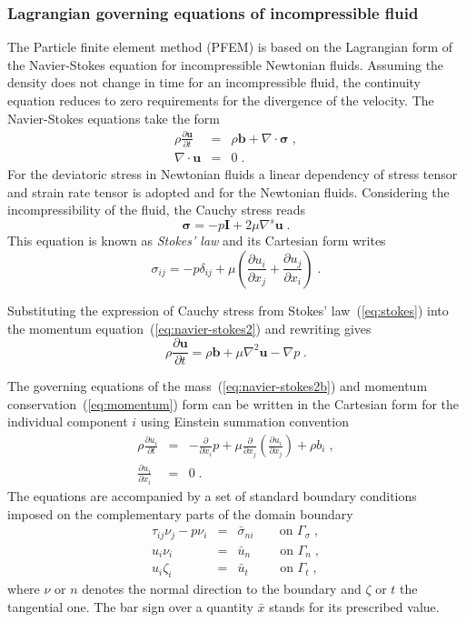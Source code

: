 \documentclass[a4paper]{article}
\newcommand{\mbf}[1]{\boldsymbol{#1}}
\newcommand{\pard}[2]{\frac{\partial{#1}}{\partial{#2}}}
\begin{document}
\subsubsection{Lagrangian governing equations of incompressible fluid}
The Particle finite element method (PFEM) is based on the Lagrangian form of the Navier-Stokes equation for incompressible Newtonian fluids. Assuming the density does not change in time for an incompressible fluid, the continuity equation reduces to zero requirements for the divergence of the velocity. The Navier-Stokes equations take the form
\begin{eqnarray}
\rho\pard{\mbf{u}}{t} &=& \rho\mbf{b} + \nabla\cdot\mbf{\sigma} \label{eq:navier-stokes2}\;,\\
\nabla\cdot\mbf{u} &=& 0\;. \label{eq:navier-stokes2b}
\end{eqnarray}
For the deviatoric stress in Newtonian fluids a linear dependency of stress tensor and strain rate tensor is adopted and for the Newtonian fluids. Considering the incompressibility of the fluid, the Cauchy stress reads
\begin{equation}\label{eq:stokes}
\mbf{\sigma}=-p\mbf{I} + 2\mu \nabla^s\mbf{u}\;.
\end{equation}
This equation is known as \emph{Stokes' law} and its Cartesian form writes
\begin{equation}
\sigma_{ij}=-p\delta_{ij}+\mu\left(\pard{u_i}{x_j}+\pard{u_j}{x_i}\right)\;.
\end{equation}
\par
Substituting the expression of Cauchy stress from Stokes' law~(\ref{eq:stokes}) into the momentum equation~(\ref{eq:navier-stokes2}) and rewriting gives
\begin{equation}
\rho\pard{\mbf{u}}{t} = \rho\mbf{b} + \mu\nabla^2\mbf{u} - \nabla p\;.\label{eq:momentum}
\end{equation}
\par
The governing equations of the mass~(\ref{eq:navier-stokes2b}) and momentum conservation~(\ref{eq:momentum}) form can be written in the Cartesian form for the individual component $i$ using Einstein summation convention
\begin{eqnarray}
\rho \pard{u_i}{t} &=& - \frac{\partial}{\partial x_i}p+\mu\frac{\partial}{\partial x_j}\left(\frac{\partial u_i}{\partial x_j}\right)+\rho b_i \;, \label{eq:mb}\\
\pard{u_i}{x_i} &=& 0\;.
\end{eqnarray}
The equations are accompanied by a set of standard boundary conditions imposed on the complementary parts of the domain boundary
\begin{eqnarray}
  \tau_{ij}\nu_j - p\nu_i &=& \bar \sigma_{ni} \qquad \mbox{on } \Gamma_{\sigma}\;, \\
  u_i\nu_i &=& \bar u_n \qquad\; \mbox{on } \Gamma_n\;, \\
  u_i\zeta_i &=& \bar u_t \qquad\;\, \mbox{on } \Gamma_t\;,
\end{eqnarray}
where $\nu$ or $n$ denotes the normal direction to the boundary and $\zeta$ or $t$ the tangential one. The bar sign over a quantity $\bar x$ stands for its prescribed value.
\end{document}

